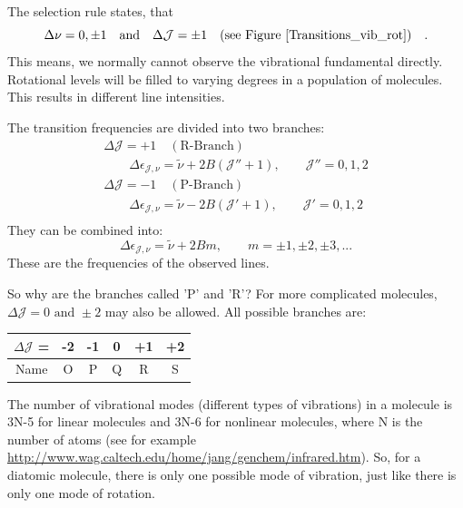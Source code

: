 The selection rule states, that
\begin{equation}
\Delta \nu = 0,\pm 1 \quad \mathrm{and} \quad \Delta \mathcal{J} = \pm 1
\quad \text{(see Figure \ref{Transitions_vib_rot})} \quad .
\end{equation}
This means, we normally cannot observe the vibrational fundamental
directly. Rotational levels will be filled to varying degrees in a
population of molecules. This results in different line intensities. 

The transition frequencies are divided into two branches:
\begin{gather*}
\Delta \mathcal{J} = +1 \quad (\text{R-Branch}) \\
\qquad \Delta \epsilon_{\mathcal{J},\nu} = \tilde{\nu} + 2 B ( \mathcal{J''} + 1), 
	\qquad \mathcal{J''} = 0, 1, 2  \\
\Delta \mathcal{J} = -1 \quad (\text{P-Branch}) \\
\qquad \Delta \epsilon_{\mathcal{J},\nu} = \tilde{\nu} - 2 B ( \mathcal{J'} + 1) , 
	\qquad \mathcal{J'} = 0, 1, 2  \\ 
\end{gather*}
 They can be combined into: 
 \begin{equation}
\Delta \epsilon_{\mathcal{J},\nu} = \tilde{\nu} + 2 B m , 
	\qquad m = \pm1, \pm2, \pm3, ...
\end{equation}
These are the frequencies of the observed lines. 

So why are the branches called 'P' and 'R'? For more complicated molecules, $\Delta \mathcal{J} = 0 \text{ and } \pm 2$ may also be allowed. All possible branches are:


\begin{center}
\begin{tabular}{|c|c|c|c|c|c|} \hline
$\Delta\mathcal{J}$ = & -2 & -1 & 0 & +1 & +2 \\
\hline
Name & O & P & Q & R & S \\
\hline
\end{tabular}
\end{center}

The number of vibrational modes (different types of vibrations) in a
molecule is 3N-5 for linear molecules and 3N-6 for nonlinear
molecules, where N is the number of atoms (see for example
\url{http://www.wag.caltech.edu/home/jang/genchem/infrared.htm}). So,
for a diatomic molecule, there is only one possible mode of vibration,
just like there is only one mode of rotation.

